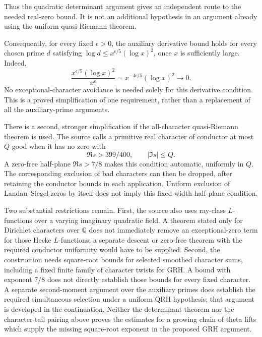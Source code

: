 Thus the quadratic determinant argument gives an independent route
to the needed real-zero bound. It is not an additional hypothesis
in an argument already using the uniform quasi-Riemann theorem.

Consequently, for every fixed $\epsilon>0$, the auxiliary derivative bound
holds for every chosen prime $d$ satisfying
$\log d\le x^{\epsilon/5}(\log x)^2$, once $x$ is sufficiently large.
Indeed,
\[
 \frac{x^{\epsilon/5}(\log x)^2}{x^\epsilon}
 =x^{-4\epsilon/5}(\log x)^2\longrightarrow0.
\]
No exceptional-character avoidance is needed solely for this derivative
condition. This is a proved simplification of one requirement, rather than
a replacement of all the auxiliary-prime arguments.

There is a second, stronger simplification if the all-character
quasi-Riemann theorem is used. The source calls a primitive real character
of conductor at most $Q$ good when it has no zero with
\[
 \Re s>399/400,\qquad |\Im s|\le Q.
\]
A zero-free half-plane $\Re s>7/8$ makes this condition automatic,
uniformly in $Q$. The corresponding exclusion of bad characters can then
be dropped, after retaining the conductor bounds in each application.
Uniform exclusion of Landau--Siegel zeros by itself does not imply this
fixed-width half-plane condition.

Two substantial restrictions remain. First, the source also uses ray-class
$L$-functions over a varying imaginary quadratic field. A theorem stated
only for Dirichlet characters over $\mathbb Q$ does not immediately remove
an exceptional-zero term for those Hecke $L$-functions; a separate descent
or zero-free theorem with the required conductor uniformity would have to
be supplied. Second, the construction needs square-root bounds for selected
smoothed character sums, including a fixed finite family of character
twists for GRH. A bound with exponent $7/8$ does not directly establish
those bounds for every fixed character. A separate second-moment argument
over the auxiliary primes does establish the required simultaneous
selection under a uniform QRH hypothesis; that argument is developed in
the continuation. Neither the determinant theorem nor the character-tail
pairing above proves the estimates for a growing chain of theta lifts
which supply the missing square-root exponent in the proposed GRH argument.



